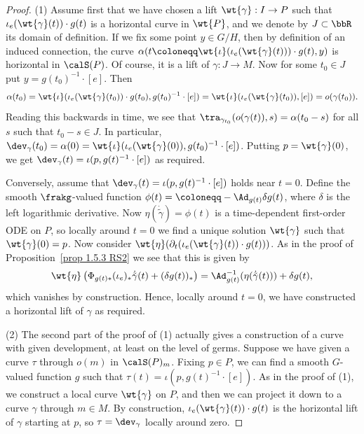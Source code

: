 \begin{proof}
    (1) Assume first that we have chosen a lift $\wt{\gamma}:I\to P$ such that $\iota_e(\wt{\gamma}(t))\cdot g(t)$ is a horizontal curve in $\wt{P}$, and we denote by $J\subset \bbR$ its domain of definition. If we fix some point $y\in G\slash H$, then by definition of an induced connection, the curve $\alpha(t\coloneqq \wt{\iota}(\iota_e(\wt{\gamma}(t)))\cdot g(t),y)$ is horizontal in $\calS(P)$. Of course, it is a lift of $\gamma:J\to M$. Now for some $t_0\in J$ put $y=g(t_0)^{-1}\cdot [e]$. Then 
    \[\alpha(t_0)=\wt{\iota}(\iota_e(\wt{\gamma}(t_0))\cdot g(t_0),g(t_0)^{-1}\cdot [e])=\wt{\iota}(\iota_e(\wt{\gamma}(t_0)),[e])=o(\gamma(t_0)).\]
    Reading this backwards in time, we see that $\tra_{\gamma_{t_0}}(o(\gamma(t)),s)=\alpha(t_0-s)$ for all $s$ such that $t_0-s\in J$. In particular, $\dev_\gamma(t_0)=\alpha(0)=\wt{\iota}(\iota_e(\wt{\gamma}(0)),g(t_0)^{-1}\cdot [e])$. Putting $p=\wt{\gamma}(0)$, we get $\dev_\gamma(t)=\iota(p,g(t)^{-1}\cdot [e])$ as required.

    Conversely, assume that $\dev_\gamma(t)=\iota(p,g(t)^{-1}\cdot [e])$ holds near $t=0$. Define the smooth $\frakg$-valued function $\phi(t)=\coloneqq -\Ad_{g(t)}\delta g(t)$, where $\delta$ is the left logarithmic derivative. Now $\eta(\dot{\tilde{\gamma}})=\phi(t)$ is a time-dependent first-order ODE on $P$, so locally around $t=0$ we find a unique solution $\wt{\gamma}$ such that $\wt{\gamma}(0)=p$. Now consider $\wt{\eta}(\partial_t(\iota_e(\wt{\gamma}(t))\cdot g(t)))$. As in the proof of Proposition~\ref{prop 1.5.3 RS2} we see that this is given by 
    \[\wt{\eta}\left(\Phi_{g(t)\ast }(\iota_e)_\ast \dot{\tilde{\gamma}}(t)+(\delta g(t))_\ast\right)=\Ad_{g(t)}^{-1}(\eta(\dot{\tilde{\gamma}}(t)))+\delta g(t),\]
    which vanishes by construction. Hence, locally around $t=0$, we have constructed a horizontal lift of $\gamma$ as required.

    (2) The second part of the proof of (1) actually gives a construction of a curve with given development, at least on the level of germs. Suppose we have given a curve $\tau$ through $o(m)$ in $\calS(P)_m$. Fixing $p\in P$, we can find a smooth $G$-valued function $g$ such that $\tau(t)=\iota(p,g(t)^{-1}\cdot [e])$. As in the proof of (1), we construct a local curve $\wt{\gamma}$ on $P$, and then we can project it down to a curve $\gamma$ through $m\in M$. By construction, $\iota_e(\wt{\gamma}(t))\cdot g(t)$ is the horizontal lift of $\gamma$ starting at $p$, so $\tau=\dev_\gamma$ locally around zero.


\end{proof}
